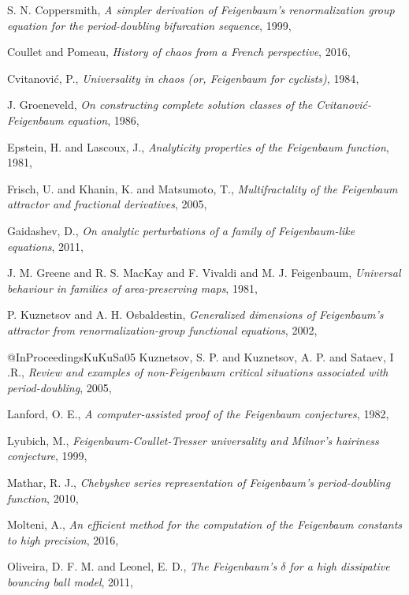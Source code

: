 \begin{description}
{S. N. Coppersmith},
{\em A simpler derivation of {Feigenbaum}'s renormalization group equation for the period-doubling bifurcation sequence},
{1999},

{Coullet and Pomeau},
{\em History of chaos from a {French} perspective},
{2016},

{Cvitanovi{\'c}, P.},
{\em Universality in chaos (or, {Feigenbaum} for cyclists)},
{1984},

{J. Groeneveld},
{\em On constructing complete solution classes of the {Cvitanovi{\'c}-Feigenbaum} equation},
{1986},

{Epstein, H. and Lascoux, J.},
{\em Analyticity properties of the {Feigenbaum} function},
{1981},

{Frisch, U. and Khanin, K. and Matsumoto, T.},
{\em Multifractality of the {Feigenbaum} attractor and fractional derivatives},
{2005},

{Gaidashev, D.},
{\em On analytic perturbations of a family of {Feigenbaum}-like equations},
 {2011},

{J. M. Greene and R. S. MacKay and F. Vivaldi and M. J. Feigenbaum},
{\em Universal behaviour in families of area-preserving maps},
{1981},

{P. Kuznetsov and A. H. Osbaldestin},
{\em Generalized dimensions of {Feigenbaum}'s attractor from renormalization-group functional equations},
{2002},

@InProceedings{KuKuSa05}
{Kuznetsov, S. P. and Kuznetsov, A. P. and Sataev, I .R.},
{\em Review and examples of non-{Feigenbaum} critical situations associated with period-doubling},
{2005},

{{Lanford}, O. E.},
{\em A computer-assisted proof of the {Feigenbaum} conjectures},
{1982},

{Lyubich, M.},
{\em {Feigenbaum-Coullet-Tresser} universality and {Milnor}'s hairiness conjecture},
{1999},

{Mathar, R. J.},
{\em {Chebyshev} series representation of {Feigenbaum's} period-doubling function},
{2010},

{Molteni, A.},
{\em An efficient method for the computation of the {Feigenbaum} constants to high precision},
{2016},

{Oliveira, D. F. M. and Leonel, E. D.},
{\em The {Feigenbaum}'s {$\delta$} for a high dissipative bouncing ball model},
{2011},


\end{description}
